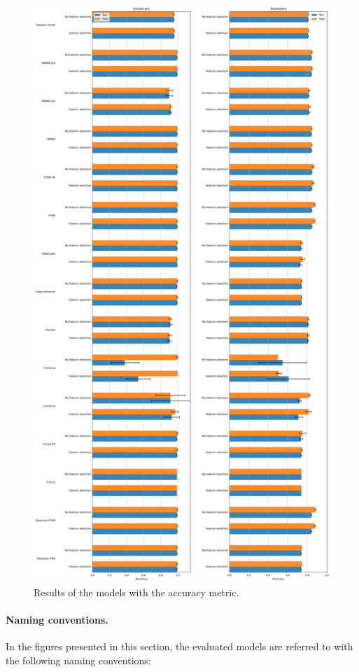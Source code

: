 \documentclass{article}
\begin{document}
\begin{figure}
    \centering
    \includegraphics[height=\textheight]{img/accuracy.png}
    \caption{Results of the models with the accuracy metric.}
    \label{fig:res:accuracy}
\end{figure}

\paragraph{Naming conventions.} In the figures presented in this section, the evaluated models are referred to with the following naming conventions:
\end{document}

